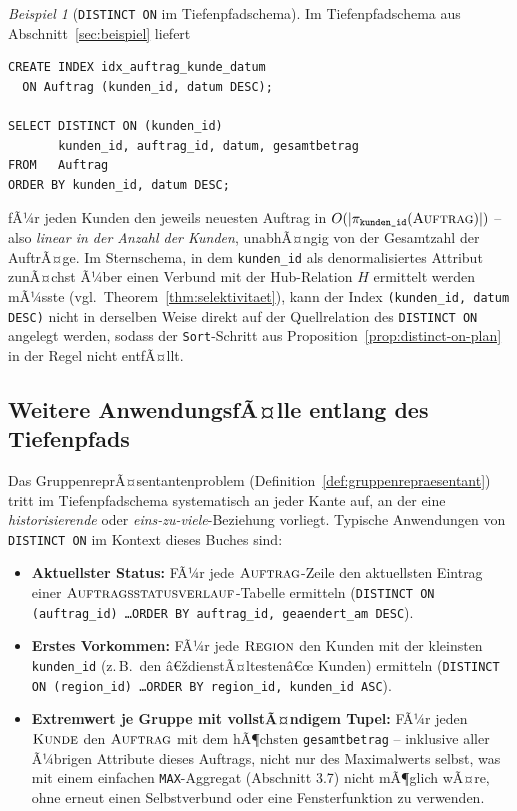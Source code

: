 ﻿\documentclass[a4paper,12pt]{report}
\theoremstyle{definition}
\theoremstyle{remark}
\newtheorem{example}{Beispiel}[chapter]
\begin{document}
\begin{example}[\texttt{DISTINCT ON} im Tiefenpfadschema]
\label{ex:distinct-on-tiefenpfad}
Im Tiefenpfadschema aus Abschnitt~\ref{sec:beispiel} liefert
\begin{lstlisting}
CREATE INDEX idx_auftrag_kunde_datum
  ON Auftrag (kunden_id, datum DESC);

SELECT DISTINCT ON (kunden_id)
       kunden_id, auftrag_id, datum, gesamtbetrag
FROM   Auftrag
ORDER BY kunden_id, datum DESC;
\end{lstlisting}
fÃ¼r jeden Kunden den jeweils neuesten Auftrag in
$O(|\pi_{\texttt{kunden\_id}}(\textsc{Auftrag})|)$ -- also
\emph{linear in der Anzahl der Kunden}, unabhÃ¤ngig von der
Gesamtzahl der AuftrÃ¤ge. Im Sternschema, in dem
\texttt{kunden\_id} als denormalisiertes Attribut zunÃ¤chst Ã¼ber
einen Verbund mit der Hub-Relation $H$ ermittelt werden mÃ¼sste (vgl.\
Theorem~\ref{thm:selektivitaet}), kann der Index
\texttt{(kunden\_id, datum DESC)} nicht in derselben Weise direkt auf
der Quellrelation des \texttt{DISTINCT ON} angelegt werden, sodass der
\texttt{Sort}-Schritt aus Proposition~\ref{prop:distinct-on-plan} in
der Regel nicht entfÃ¤llt.
\end{example}

\subsection{Weitere AnwendungsfÃ¤lle entlang des Tiefenpfads}

Das GruppenreprÃ¤sentantenproblem (Definition~\ref{def:gruppenrepraesentant})
tritt im Tiefenpfadschema systematisch an jeder Kante auf, an der eine
\emph{historisierende} oder \emph{eins-zu-viele}-Beziehung vorliegt.
Typische Anwendungen von \texttt{DISTINCT ON} im Kontext dieses Buches
sind:

\begin{itemize}
  \item \textbf{Aktuellster Status:} FÃ¼r jede
    $\textsc{Auftrag}$-Zeile den aktuellsten Eintrag einer
    $\textsc{Auftragsstatusverlauf}$-Tabelle ermitteln
    (\texttt{DISTINCT ON (auftrag\_id) \ldots ORDER BY auftrag\_id,
    geaendert\_am DESC}).
  \item \textbf{Erstes Vorkommen:} FÃ¼r jede $\textsc{Region}$ den
    Kunden mit der kleinsten \texttt{kunden\_id} (z.\,B.\ den
    â€ždienstÃ¤ltestenâ€œ Kunden) ermitteln
    (\texttt{DISTINCT ON (region\_id) \ldots ORDER BY region\_id,
    kunden\_id ASC}).
  \item \textbf{Extremwert je Gruppe mit vollstÃ¤ndigem Tupel:}
    FÃ¼r jeden $\textsc{Kunde}$ den $\textsc{Auftrag}$ mit dem
    hÃ¶chsten \texttt{gesamtbetrag} -- inklusive aller Ã¼brigen
    Attribute dieses Auftrags, nicht nur des Maximalwerts selbst, was
    mit einem einfachen \texttt{MAX}-Aggregat (Abschnitt 3.7) nicht
    mÃ¶glich wÃ¤re, ohne erneut einen Selbstverbund oder eine
    Fensterfunktion zu verwenden.
\end{itemize}
\end{document}
